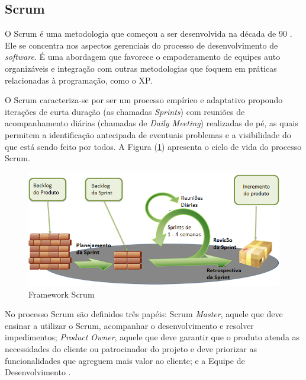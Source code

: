 \subsection[Scrum]{Scrum}

O Scrum é uma metodologia que começou a ser desenvolvida na década de 90 \cite{ken}. Ele se concentra nos aspectos gerenciais do processo de desenvolvimento de \textit{software}. É uma abordagem que favorece o empoderamento de equipes auto organizáveis e integração com outras metodologias que foquem em práticas relacionadas à programação, como o XP.

O Scrum caracteriza-se por ser um processo empírico e adaptativo propondo iterações de curta duração (as chamadas \textit{Sprints}) com reuniões de acompanhamento diárias (chamadas de \textit{Daily Meeting}) realizadas de pé, as quais permitem a identificação antecipada de eventuais problemas e a visibilidade do que está sendo feito por todos. A Figura (\ref{fscrum}) apresenta o ciclo de vida do processo Scrum.

\begin{figure}[h]
	\centering
		\label{fig01}
			\includegraphics[scale=0.99]{figuras/scrum.png}
		\caption{Framework Scrum}
\label{fscrum}
\end{figure}

No processo Scrum são definidos três papéis: Scrum \textit{Master}, aquele que deve ensinar a utilizar o Scrum, acompanhar o desenvolvimento e resolver impedimentos; \textit{Product Owner}, aquele que deve garantir que o produto atenda as necessidades do cliente ou patrocinador do projeto e deve priorizar as funcionalidades que agreguem mais valor ao cliente; e a Equipe de Desenvolvimento   \cite{jeff}.

